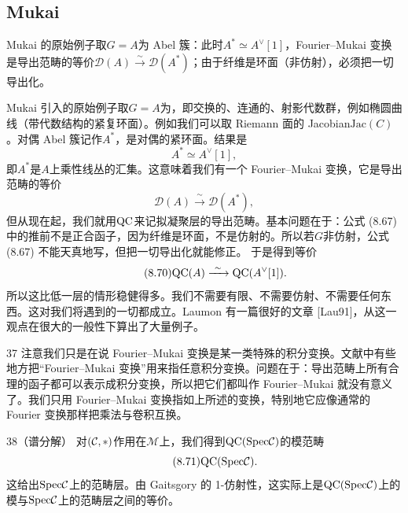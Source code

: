 \subsection{Mukai}
\begin{sectionkey}
Mukai 的原始例子取$G=A$为 Abel 簇：此时$A^{*}\simeq A^{\vee}[1]$，Fourier--Mukai 变换是导出范畴的等价$\mathcal D(A)\xrightarrow{\sim}\mathcal D(A^{*})$；由于纤维是环面（非仿射），必须把一切导出化。
\end{sectionkey}

Mukai 引入的原始例子取$G=A$为，即交换的、连通的、射影代数群，例如椭圆曲线（带代数结构的紧复环面）。例如我们可以取 Riemann 面的 Jacobian$\mathrm{Jac}(C)$。对偶 Abel 簇记作$A^{*}$，是对偶的紧环面。结果是
\begin{equation}\tag{8.68}
A^{*}\simeq A^{\vee}[1],
\end{equation}
即$A^{*}$是$A$上乘性线丛的汇集。这意味着我们有一个 Fourier--Mukai 变换，它是导出范畴的等价
\begin{equation}\tag{8.69}
\mathcal D(A)\xrightarrow{\ \sim\ }\mathcal D(A^{*}),
\end{equation}
但从现在起，我们就用$\mathrm{QC}$来记拟凝聚层的导出范畴。基本问题在于：公式 (8.67) 中的推前不是正合函子，因为纤维是环面，不是仿射的。所以若$G$非仿射，公式 (8.67) 不能天真地写，但把一切导出化就能修正。
于是得到等价
\begin{equation}\tag{8.70}
\mathrm{QC}(A)\xrightarrow{\ \sim\ }\mathrm{QC}(A^{\vee}[1]).
\end{equation}
所以这比低一层的情形稳健得多。我们不需要有限、不需要仿射、不需要任何东西。这对我们将遇到的一切都成立。Laumon 有一篇很好的文章 [Lau91]，从这一观点在很大的一般性下算出了大量例子。

\begin{srcrem}{37}
注意我们只是在说 Fourier--Mukai 变换是某一类特殊的积分变换。文献中有些地方把“Fourier--Mukai 变换”用来指任意积分变换。问题在于：导出范畴上所有合理的函子都可以表示成积分变换，所以把它们都叫作 Fourier--Mukai 就没有意义了。我们只用 Fourier--Mukai 变换指如上所述的变换，特别地它应像通常的 Fourier 变换那样把乘法与卷积互换。
\end{srcrem}

\begin{srcrem}{38}（谱分解）
对$(\mathcal{C},*)$作用在$\mathcal M$上，我们得到$\mathrm{QC}(\mathrm{Spec}\mathcal{C})$的模范畴
\begin{equation}\tag{8.71}
\mathrm{QC}(\mathrm{Spec}\mathcal{C}).
\end{equation}
这给出$\mathrm{Spec}\mathcal{C}$上的范畴层。由 Gaitsgory 的 1-仿射性，这实际上是$\mathrm{QC}(\mathrm{Spec}\mathcal{C})$上的模与$\mathrm{Spec}\mathcal{C}$上的范畴层之间的等价。
\end{srcrem}

